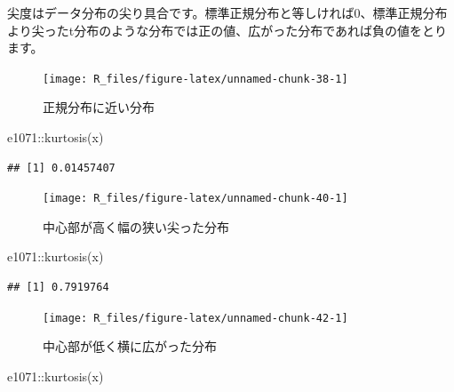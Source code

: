 \documentclass[
  12pt,
]{book}
\newenvironment{Shaded}{\begin{snugshade}}{\end{snugshade}}
\newcommand{\FunctionTok}[1]{\textcolor[rgb]{0.00,0.00,0.00}{#1}}
\newcommand{\NormalTok}[1]{#1}
\newcommand{\SpecialCharTok}[1]{\textcolor[rgb]{0.00,0.00,0.00}{#1}}
\begin{document}
尖度はデータ分布の尖り具合です。標準正規分布と等しければ\(0\)、標準正規分布より尖ったt分布のような分布では正の値、広がった分布であれば負の値をとります。

\begin{figure}[H]

{\centering \texttt{[image: R\_files/figure-latex/unnamed-chunk-38-1]} 

}

\caption{正規分布に近い分布}\label{fig:unnamed-chunk-38}
\end{figure}

\begin{Shaded}
\begin{Highlighting}[numbers=left,,]
\NormalTok{e1071}\SpecialCharTok{::}\FunctionTok{kurtosis}\NormalTok{(x)}
\end{Highlighting}
\end{Shaded}

\begin{verbatim}
## [1] 0.01457407
\end{verbatim}

\begin{figure}[H]

{\centering \texttt{[image: R\_files/figure-latex/unnamed-chunk-40-1]} 

}

\caption{中心部が高く幅の狭い尖った分布}\label{fig:unnamed-chunk-40}
\end{figure}

\begin{Shaded}
\begin{Highlighting}[numbers=left,,]
\NormalTok{e1071}\SpecialCharTok{::}\FunctionTok{kurtosis}\NormalTok{(x)}
\end{Highlighting}
\end{Shaded}

\begin{verbatim}
## [1] 0.7919764
\end{verbatim}

\begin{figure}[H]

{\centering \texttt{[image: R\_files/figure-latex/unnamed-chunk-42-1]} 

}

\caption{中心部が低く横に広がった分布}\label{fig:unnamed-chunk-42}
\end{figure}

\begin{Shaded}
\begin{Highlighting}[numbers=left,,]
\NormalTok{e1071}\SpecialCharTok{::}\FunctionTok{kurtosis}\NormalTok{(x)}
\end{Highlighting}
\end{Shaded}
\end{document}
